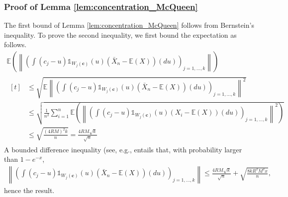 \documentclass[noinfoline,preprint]{article}
\newcommand{\cb}{\mathbf{c}}
\newcommand{\E}{\mathbb{E}}
\renewcommand{\1}{\mathds 1}
\begin{document}
\subsubsection{Proof of Lemma \ref{lem:concentration_McQueen}}\label{sec:proof_lem_concentration_McQueen}
The first bound of Lemma \ref{lem:concentration_McQueen} follows from Bernstein's inequality. 
To prove the second inequality, we first bound the expectation as follows.
\begin{multline*}
\mathbb{E} \left ( \left \|  \left ( \int (c_j-u)\1_{W_j(\cb)}(u)(\bar{X}_n-\E(X))(du) \right )_{j=1, \hdots, k} \right \| \right ) \\
\begin{aligned}[t]
&\leq \sqrt{\E \left \|  \left ( \int (c_j-u)\1_{W_j(\cb)}(u) (\bar{X}_n-\E(X))(du) \right )_{j=1, \hdots, k} \right \|^2 } \\
 & \leq \sqrt{\frac{1}{n^2} \sum_{i=1}^n \E \left ( \left \|  \left ( \int (c_j-u)\1_{W_j(\cb)}(u) (X_i-\E(X))(du) \right )_{j=1, \hdots, k} \right \|^2 \right )} \\
& \leq \sqrt{\frac{(4RM)^2k}{n}} = \frac{4RM\sqrt{k}}{\sqrt{n}}
\end{aligned}
\end{multline*}
A bounded difference inequality (see, e.g., \cite[Theorem 6.2]{Massart13} entails that, with probability larger than $1-e^{-x}$, 
\begin{align*}
\left \|  \left ( \int (c_j-u)\1_{W_j(\cb)}(u)(\bar{X}_n-\E(X))(du) \right )_{j=1, \hdots, k} \right \| \leq  \frac{4RM\sqrt{k}}{\sqrt{n}} + \sqrt{\frac{8kR^2M^2x}{n}},
\end{align*}
hence the result.
\end{document}
